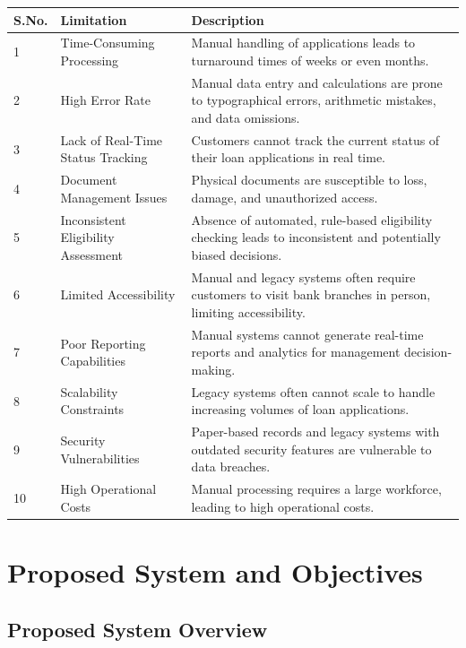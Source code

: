 \documentclass[12pt,a4paper,oneside]{report}
\begin{document}
\begin{table}[htbp]
\centering
\small
\begin{tabularx}{\textwidth}{l l X}
\toprule
\textbf{S.No.} & \textbf{Limitation} & \textbf{Description} \\
\midrule
1 & Time-Consuming Processing & Manual handling of applications leads to turnaround times of weeks or even months. \\
2 & High Error Rate & Manual data entry and calculations are prone to typographical errors, arithmetic mistakes, and data omissions. \\
3 & Lack of Real-Time Status Tracking & Customers cannot track the current status of their loan applications in real time. \\
4 & Document Management Issues & Physical documents are susceptible to loss, damage, and unauthorized access. \\
5 & Inconsistent Eligibility Assessment & Absence of automated, rule-based eligibility checking leads to inconsistent and potentially biased decisions. \\
6 & Limited Accessibility & Manual and legacy systems often require customers to visit bank branches in person, limiting accessibility. \\
7 & Poor Reporting Capabilities & Manual systems cannot generate real-time reports and analytics for management decision-making. \\
8 & Scalability Constraints & Legacy systems often cannot scale to handle increasing volumes of loan applications. \\
9 & Security Vulnerabilities & Paper-based records and legacy systems with outdated security features are vulnerable to data breaches. \\
10 & High Operational Costs & Manual processing requires a large workforce, leading to high operational costs. \\
\bottomrule
\end{tabularx}
\end{table}

\section{Proposed System and Objectives}

\subsection{Proposed System Overview}
\end{document}
